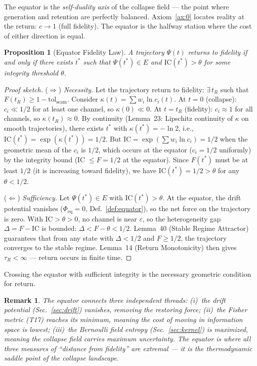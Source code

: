 \documentclass[
  aps,
  prd,
  preprint,
  superscriptaddress,
  nofootinbib,
  floatfix,
  longbibliography
]{revtex4-2}
\newtheorem{proposition}[theorem]{Proposition}
\newtheorem{remark}{Remark}
\newcommand{\tR}{\tau_{\!R}}
\newcommand{\eps}{\varepsilon}
\newcommand{\tolseam}{\mathrm{tol}_{\mathrm{seam}}}
\newcommand{\IC}{\mathrm{IC}}
\newcommand{\Fid}{F}
\newcommand{\Logint}{\kappa}
\newcommand{\Psifield}{\Psi}
\newcommand{\hetgap}{\Delta}
\begin{document}
The equator is the \emph{self-duality axis} of the collapse
field — the point where generation and retention are
perfectly balanced. Axiom~\ref{ax:0} locates reality at
the return: $c \to 1$ (full fidelity). The equator is the
halfway station where the cost of either direction is equal.

\begin{proposition}[Equator Fidelity Law]\label{prop:equator}
A trajectory $\Psifield(t)$ returns to fidelity if and only if
there exists $t^*$ such that $\Psifield(t^*) \in E$ and
$\IC(t^*) > \theta$ for some integrity threshold $\theta$.
\end{proposition}

\begin{proof}[Proof sketch]
($\Rightarrow$) \emph{Necessity.}
Let the trajectory return to fidelity:
$\exists\, t_R$ such that $\Fid(t_R) \geq 1 - \tolseam$.
Consider $\Logint(t) = \sum w_i \ln c_i(t)$.
At $t = 0$ (collapse): $c_i \ll 1/2$ for at least one channel,
so $\Logint(0) \ll 0$.
At $t = t_R$ (fidelity): $c_i \approx 1$ for all channels,
so $\Logint(t_R) \approx 0$.
By continuity (Lemma~23: Lipschitz continuity of $\Logint$
on smooth trajectories), there exists $t^*$ with
$\Logint(t^*) = -\ln 2$, i.e., $\IC(t^*) = \exp(\Logint(t^*))
= 1/2$.
But $\IC = \exp(\sum w_i \ln c_i) = 1/2$ when the
geometric mean of the $c_i$ is $1/2$, which occurs at
the equator ($c_i = 1/2$ uniformly) by the
integrity bound (IC $\leq \Fid = 1/2$ at the equator).
Since $\Fid(t^*)$ must be at least $1/2$ (it is increasing toward
fidelity), we have $\IC(t^*) = 1/2 > \theta$ for any
$\theta < 1/2$.

($\Leftarrow$) \emph{Sufficiency.}
Let $\Psifield(t^*) \in E$ with $\IC(t^*) > \theta$.
At the equator, the drift potential vanishes
($\Phi_{\mathrm{eq}} = 0$, Def.~\ref{def:equator}),
so the net force on the trajectory is zero.
With $\IC > \theta > 0$, no channel is near $\eps$,
so the heterogeneity gap $\hetgap = \Fid - \IC$ is
bounded: $\hetgap < \Fid - \theta < 1/2$.
Lemma~40 (Stable Regime Attractor) guarantees that from
any state with $\hetgap < 1/2$ and $\Fid \geq 1/2$,
the trajectory converges to the stable regime.
Lemma~14 (Return Monotonicity) then gives
$\tR < \infty$ — return occurs in finite time.
\end{proof}

Crossing the equator with sufficient integrity is the
necessary geometric condition for return.

\begin{remark}
The equator connects three independent threads:
(i)~the drift potential (Sec.~\ref{sec:drift}) vanishes,
removing the restoring force;
(ii)~the Fisher metric (T17) reaches its minimum,
meaning the cost of moving in information space is lowest;
(iii)~the Bernoulli field entropy
(Sec.~\ref{sec:kernel}) is maximized,
meaning the collapse field carries maximum uncertainty.
The equator is where all three measures of
``distance from fidelity'' are extremal — it is the
thermodynamic saddle point of the collapse landscape.
\end{remark}
\end{document}
